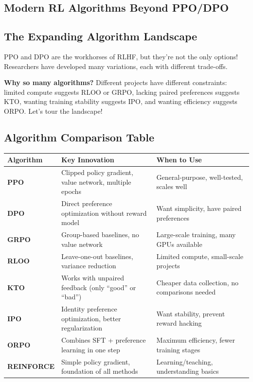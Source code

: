 \begin{chapterenv}

\chapter{Modern RL Algorithms Beyond PPO/DPO}

\section{The Expanding Algorithm Landscape}

PPO and DPO are the workhorses of RLHF, but they're not the only options! Researchers have developed many variations, each with different trade-offs.

\textbf{Why so many algorithms?} Different projects have different constraints: limited compute suggests RLOO or GRPO, lacking paired preferences suggests KTO, wanting training stability suggests IPO, and wanting efficiency suggests ORPO. Let's tour the landscape!

\section{Algorithm Comparison Table}

\begin{center}
\small
\begin{tabular}{p{}p{}p{}}
\toprule
\textbf{Algorithm} & \textbf{Key Innovation} & \textbf{When to Use} \\
\midrule
\textbf{PPO} & Clipped policy gradient, value network, multiple epochs & General-purpose, well-tested, scales well \\
\textbf{DPO} & Direct preference optimization without reward model & Want simplicity, have paired preferences \\
\textbf{GRPO} & Group-based baselines, no value network & Large-scale training, many GPUs available \\
\textbf{RLOO} & Leave-one-out baselines, variance reduction & Limited compute, small-scale projects \\
\textbf{KTO} & Works with unpaired feedback (only ``good'' or ``bad'') & Cheaper data collection, no comparisons needed \\
\textbf{IPO} & Identity preference optimization, better regularization & Want stability, prevent reward hacking \\
\textbf{ORPO} & Combines SFT + preference learning in one step & Maximum efficiency, fewer training stages \\
\textbf{REINFORCE} & Simple policy gradient, foundation of all methods & Learning/teaching, understanding basics \\
\bottomrule
\end{tabular}
\end{center}


\end{chapterenv}
